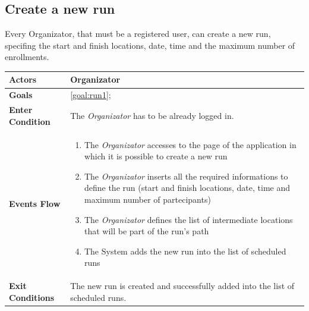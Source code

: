   \subsection{Create a new run}
Every Organizator, that must be a registered user, can create a new run, specifing the start and finish locations, date, time and the maximum number of enrollments.

\begin{table}[H]
	\centering
    
    \begin{tabular}{|p{3.5cm}|p{10.3cm}|}
    
    \hline
    \textbf{\large{Actors}}  			& \tabitem Organizator 	\\
    				 					
    \hline
    \textbf{\large{Goals}} 				& \ref{goal:run1};\\
    
    \hline
    \textbf{\large{Enter Condition}}	& The \emph{Organizator} has to be already logged in.		\\
    
    \hline
    \textbf{\large{Events Flow}}		& \begin{enumerate}[leftmargin=0.5cm]
                                          	\item The \emph{Organizator}  accesses to the page of the application in which it is possible to create a new run
                                            \item The \emph{Organizator} inserts all the required informations to define the run (start and finish locations, date, time and maximum number of partecipants)
                                             \item The \emph{Organizator} defines the list of intermediate locations that will be part of the run's path
                                            \item The System adds the new run into the list of scheduled runs
                                           
                                          \end{enumerate}
    										\\
    \hline
    \textbf{\large{Exit Conditions}}    & The new run is created and successfully added into the list of scheduled runs.  \\
    

\end{tabular}
\end{table}
